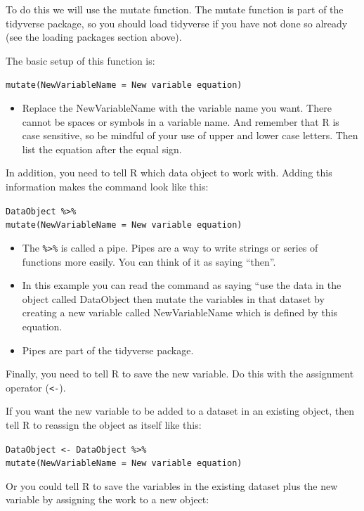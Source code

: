 \documentclass[
]{book}
\providecommand{\tightlist}{%
  \setlength{\itemsep}{0pt}\setlength{\parskip}{0pt}}
\begin{document}
To do this we will use the mutate function. The mutate function is part of the tidyverse package, so you should load tidyverse if you have not done so already (see the loading packages section above).

The basic setup of this function is:

\texttt{mutate(NewVariableName\ =\ New\ variable\ equation)}

\begin{itemize}
\tightlist
\item
  Replace the NewVariableName with the variable name you want. There cannot be spaces or symbols in a variable name. And remember that R is case sensitive, so be mindful of your use of upper and lower case letters. Then list the equation after the equal sign.
\end{itemize}

In addition, you need to tell R which data object to work with. Adding this information makes the command look like this:

\texttt{DataObject\ \%\textgreater{}\%}\\
\texttt{mutate(NewVariableName\ =\ New\ variable\ equation)}

\begin{itemize}
\tightlist
\item
  The \texttt{\%\textgreater{}\%} is called a pipe. Pipes are a way to write strings or series of functions more easily. You can think of it as saying ``then''.\\
\item
  In this example you can read the command as saying ``use the data in the object called DataObject then mutate the variables in that dataset by creating a new variable called NewVariableName which is defined by this equation.\\
\item
  Pipes are part of the tidyverse package.
\end{itemize}

Finally, you need to tell R to save the new variable. Do this with the assignment operator (\texttt{\textless{}-}).

If you want the new variable to be added to a dataset in an existing object, then tell R to reassign the object as itself like this:

\texttt{DataObject\ \textless{}-\ DataObject\ \%\textgreater{}\%}\\
\texttt{mutate(NewVariableName\ =\ New\ variable\ equation)}

Or you could tell R to save the variables in the existing dataset plus the new variable by assigning the work to a new object:
\end{document}

